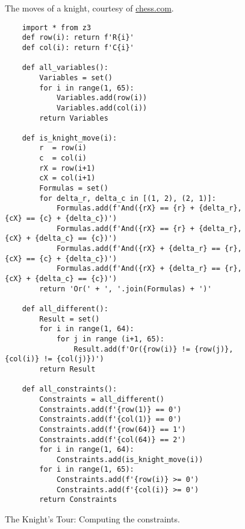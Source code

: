 \begin{figure}[!ht]
  \centering
  \caption{The moves of a knight, courtesy of \href{https://www.chess.com/}{chess.com}.}
  \label{fig:knight-moves.png}
\end{figure}

\begin{figure}[!ht]
\centering
\begin{verbatim}
    import * from z3
    def row(i): return f'R{i}'
    def col(i): return f'C{i}'
    
    def all_variables():
        Variables = set()
        for i in range(1, 65):
            Variables.add(row(i))
            Variables.add(col(i))
        return Variables

    def is_knight_move(i):
        r  = row(i)
        c  = col(i)
        rX = row(i+1)
        cX = col(i+1)
        Formulas = set()
        for delta_r, delta_c in [(1, 2), (2, 1)]:
            Formulas.add(f'And({rX} == {r} + {delta_r}, {cX} == {c} + {delta_c})')
            Formulas.add(f'And({rX} == {r} + {delta_r}, {cX} + {delta_c} == {c})')
            Formulas.add(f'And({rX} + {delta_r} == {r}, {cX} == {c} + {delta_c})')
            Formulas.add(f'And({rX} + {delta_r} == {r}, {cX} + {delta_c} == {c})')
        return 'Or(' + ', '.join(Formulas) + ')'    
    
    def all_different():
        Result = set()
        for i in range(1, 64):
            for j in range (i+1, 65):
                Result.add(f'Or({row(i)} != {row(j)}, {col(i)} != {col(j)})')
        return Result
    
    def all_constraints():
        Constraints = all_different()
        Constraints.add(f'{row(1)} == 0')
        Constraints.add(f'{col(1)} == 0')
        Constraints.add(f'{row(64)} == 1')
        Constraints.add(f'{col(64)} == 2')
        for i in range(1, 64):
            Constraints.add(is_knight_move(i))
        for i in range(1, 65):
            Constraints.add(f'{row(i)} >= 0')
            Constraints.add(f'{col(i)} >= 0')
        return Constraints
\end{verbatim}
\vspace*{-0.3cm}
\caption{The Knight's Tour: Computing the constraints.}
\label{fig:Knight's Tour with Z3.ipynb-1}
\end{figure}



